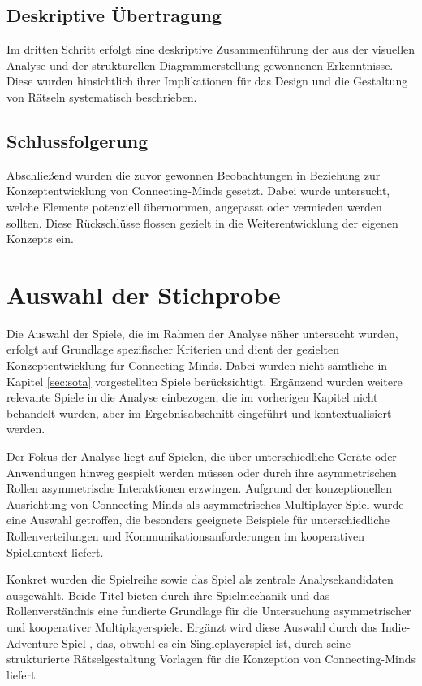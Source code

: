 \subsection{Deskriptive Übertragung}
Im dritten Schritt erfolgt eine deskriptive Zusammenführung der aus der visuellen Analyse und der strukturellen Diagrammerstellung gewonnenen Erkenntnisse. Diese wurden hinsichtlich ihrer Implikationen für das Design und die Gestaltung von Rätseln systematisch beschrieben.

\subsection{Schlussfolgerung}
Abschließend wurden die zuvor gewonnen Beobachtungen in Beziehung zur Konzeptentwicklung von Connecting-Minds gesetzt. Dabei wurde untersucht, welche Elemente potenziell übernommen, angepasst oder vermieden werden sollten. Diese Rückschlüsse flossen gezielt in die Weiterentwicklung der eigenen Konzepts ein.

\section{Auswahl der Stichprobe}
Die Auswahl der Spiele, die im Rahmen der Analyse näher untersucht wurden, erfolgt auf Grundlage spezifischer Kriterien und dient der gezielten Konzeptentwicklung für Connecting-Minds. Dabei wurden nicht sämtliche in Kapitel \ref{sec:sota} vorgestellten Spiele berücksichtigt. Ergänzend wurden weitere relevante Spiele in die Analyse einbezogen, die im vorherigen Kapitel nicht behandelt wurden, aber im Ergebnisabschnitt eingeführt und kontextualisiert werden.

Der Fokus der Analyse liegt auf Spielen, die über unterschiedliche Geräte oder Anwendungen hinweg gespielt werden müssen oder durch ihre asymmetrischen Rollen asymmetrische Interaktionen erzwingen. Aufgrund der konzeptionellen Ausrichtung von Connecting-Minds als asymmetrisches Multiplayer-Spiel wurde eine Auswahl getroffen, die besonders geeignete Beispiele für unterschiedliche Rollenverteilungen und Kommunikationsanforderungen im kooperativen Spielkontext liefert.

Konkret wurden die Spielreihe  sowie das Spiel  als zentrale Analysekandidaten ausgewählt. Beide Titel bieten durch ihre Spielmechanik und das Rollenverständnis eine fundierte Grundlage für die Untersuchung asymmetrischer und kooperativer Multiplayerspiele. Ergänzt wird diese Auswahl durch das Indie-Adventure-Spiel , das, obwohl es ein Singleplayerspiel ist, durch seine strukturierte Rätselgestaltung Vorlagen für die Konzeption von Connecting-Minds liefert.


